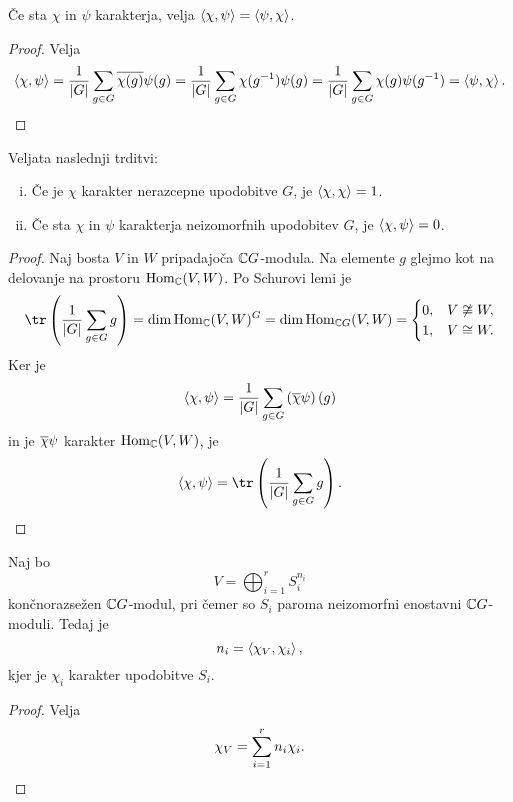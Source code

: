 \obvs

\begin{trditev}
Če sta $\chi$ in $\psi$ karakterja, velja
$\left\langle \chi, \psi\right\rangle = \left\langle \psi, \chi\right\rangle$.
\end{trditev}

\begin{proof}
Velja
\[
\left\langle \chi, \psi\right\rangle =
\frac{1}{\left\lvert G\right\rvert} \sum_{g \in G} \overline{\chi(g)} \psi(g) =
\frac{1}{\left\lvert G\right\rvert} \sum_{g \in G} \chi(g^{-1}) \psi(g) =
\frac{1}{\left\lvert G\right\rvert} \sum_{g \in G} \chi(g) \psi(g^{-1}) =
\left\langle \psi, \chi\right\rangle. \qedhere
\]
\end{proof}

\begin{trditev}
Veljata naslednji trditvi:

\begin{enumerate}[i)]
\item Če je $\chi$ karakter nerazcepne upodobitve $G$, je
$\left\langle \chi, \chi\right\rangle = 1$.
\item Če sta $\chi$ in $\psi$ karakterja neizomorfnih upodobitev
$G$, je $\left\langle \chi, \psi\right\rangle = 0$.
\end{enumerate}
\end{trditev}

\begin{proof}
Naj bosta $V$ in $W$ pripadajoča $\mathbb{C} G$-modula. Na elemente $g$
glejmo kot na delovanje na prostoru $\operatorname{Hom}_{\mathbb{C}}(V,W)$. Po Schurovi
lemi je
\[
\tr \br{\frac{1}{\abs{G}} \sum_{g \in G} g} =
\dim \Hom_\C(V, W)^G =
\dim \Hom_{\C G}(V, W) =
\begin{cases}
0, & V \not \cong W, \\
1, & V \cong W.
\end{cases}
\]
Ker je
\[
\left\langle \chi, \psi\right\rangle =
\frac{1}{\left\lvert G\right\rvert} \sum_{g \in G} \left(\overline{\chi} \psi\right)(g)
\]
in je $\overline{\chi} \psi$ karakter $\operatorname{Hom}_{\mathbb{C}}(V, W)$, je
\[
\skl{\chi, \psi} =
\tr \br{\frac{1}{\abs{G}} \sum_{g \in G} g}. \qedhere
\]
\end{proof}

\begin{posledica}
Naj bo
\[
V = \bigoplus_{i=1}^r S_i^{n_i}
\]
končnorazsežen $\mathbb{C} G$-modul, pri čemer so $S_i$ paroma neizomorfni
enostavni $\mathbb{C} G$-moduli. Tedaj je
\[
n_i = \left\langle \chi_V, \chi_i\right\rangle,
\]
kjer je $\chi_i$ karakter upodobitve $S_i$.
\end{posledica}

\begin{proof}
Velja
\[
\chi_V = \sum_{i=1}^r n_i \chi_i. \qedhere
\]
\end{proof}


